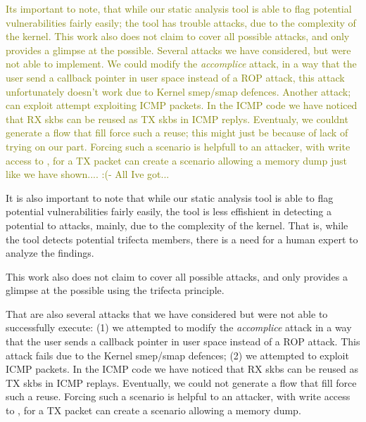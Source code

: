 \smallskip
\textcolor{olive}{Its important to note, that while our static analysis tool is able to flag potential \simple vulnerabilities fairly easily; the tool has trouble \compound attacks, due to the complexity of the kernel. This work also does not claim to cover all possible \compound attacks, and only provides a glimpse at the possible. Several attacks we have considered, but were not able to implement. We could modify the \emph{accomplice} attack, in a way that the user send a callback pointer in user space instead of a ROP attack, this attack unfortunately doesn't work due to Kernel smep/smap defences. Another attack; can exploit attempt exploiting ICMP packets. In the ICMP code we have noticed that RX skbs can be reused as TX skbs in ICMP replys. Eventualy, we couldnt generate a flow that fill force such a reuse; this might just be because of lack of trying on our part. Forcing such a scenario is helpfull to an attacker, with write access to \shinfo{}, for a TX packet can create a scenario allowing a memory dump just like we have shown.... :(- All Ive got... }


It is also important to note that while our static analysis tool is able to flag potential \simple{} vulnerabilities fairly easily, the tool is less effishient in detecting a potential to \compound{} attacks, mainly, due to the complexity of the kernel. That is, while the tool detects potential trifecta members, there is a need for a human expert to analyze the findings. 

This work also does not claim to cover all possible \compound{} attacks, and only provides a glimpse at the possible using the trifecta principle. 

That are also several attacks that we have considered but were not able to successfully execute: (1) we attempted to modify the \emph{accomplice} attack in a way that the user sends a callback pointer in user space instead of a ROP attack. This attack fails due to the Kernel smep/smap defences; (2) we attempted to exploit ICMP packets. In the ICMP code we have noticed that RX skbs can be reused as TX skbs in ICMP replays. Eventually, we could not generate a flow that fill force such a reuse. Forcing such a scenario is helpful to an attacker, with write access to \shinfo{}, for a TX packet can create a scenario allowing a memory dump.










